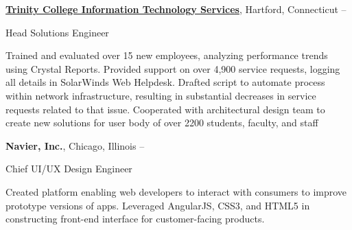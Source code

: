 \documentclass[letterpaper,10pt,oneside]{article}
\begin{document}
\begin{body}
\begin{comment}
\BigGapNoBreak
{\textbf{Trinity College Office of Enrollment}},
Hartford, Connecticut
\hfill
\DatestampYMD{2017}{08}{21} --
\DatestampYMD{2018}{05}{18}


\GapNoBreak
\BulletItem
Student Admissions Associate
\begin{detail}
\SubBulletItem
Conducted interviews with over 50 high school students, evaluating their standing as applicants, which resulted in 11 admitted students for the Class of 2022.
\SubBulletItem
Submitted written evaluations on each applicant to be added to applicant’s file.
\SubBulletItem
Led weekly group information sessions for prospective students, families, and admissions visitors.
\SubBulletItem
Participated in on-campus recruitment events, such as panels, special programs, and other projects.
\end{detail}
\end{comment}

\BigGapNoBreak
\href{http://www.trincoll.edu}
{\textbf{Trinity College Information Technology Services}},
Hartford, Connecticut
\hfill
{} --

\GapNoBreak
\BulletItem
Head Solutions Engineer
\begin{detail}
\SubBulletItem
Trained and evaluated over 15 new employees, analyzing performance trends using Crystal Reports.
\SubBulletItem
Provided support on over 4,900 service requests, logging all details in SolarWinds Web Helpdesk.
\SubBulletItem
Drafted script to automate process within network infrastructure, resulting in substantial decreases in service requests related to that issue.
\SubBulletItem
Cooperated with architectural design team to create new solutions for user body of over 2200 students, faculty, and staff
\end{detail}

\BigGapNoBreak
{\textbf{Navier, Inc.}},
Chicago, Illinois
\hfill
{} --

\GapNoBreak
\BulletItem
Chief UI/UX Design Engineer
\begin{detail}
\SubBulletItem
Created platform enabling web developers to interact with consumers to improve prototype versions of apps.
\SubBulletItem
Leveraged AngularJS, CSS3, and HTML5 in constructing front-end interface for customer-facing products.
\end{detail}



\end{body}
\end{document}

